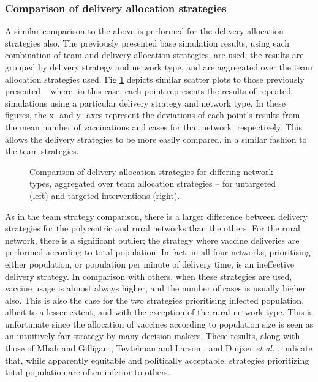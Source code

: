 \documentclass[10pt,letterpaper]{article}
\begin{document}
\subsubsection*{Comparison of delivery allocation strategies}
A similar comparison to the above is performed for the delivery allocation strategies also. The previously presented base simulation results, using each combination of team and delivery allocation strategies, are used; the results are grouped by delivery strategy and network type, and are aggregated over the team allocation strategies used. Fig \ref{fig:vacc_scatter} depicts similar scatter plots to those previously presented -- where, in this case, each point represents the results of repeated simulations using a particular delivery strategy and network type. In these figures, the x- and y- axes represent the deviations of each point's results from the mean number of vaccinations and cases for that network, respectively. This allows the delivery strategies to be more easily compared, in a similar fashion to the team strategies.

\begin{figure}[ht!]
  \caption{Comparison of delivery allocation strategies for differing network types, aggregated over team allocation strategies -- for untargeted (left) and targeted interventions (right).}
   \label{fig:vacc_scatter}
\end{figure}

As in the team strategy comparison, there is a larger difference between delivery strategies for the polycentric and rural networks than the others. For the rural network, there is a significant outlier; the strategy where vaccine deliveries are performed according to total population. In fact, in all four networks, prioritising either population, or population per minute of delivery time, is an ineffective delivery strategy. In comparison with others, when these strategies are used, vaccine usage is almost always higher, and the number of cases is usually higher also. This is also the case for the two strategies prioritising infected population, albeit to a lesser extent, and with the exception of the rural network type. This is unfortunate since the allocation of vaccines according to population size is seen as an intuitively fair strategy by many decision makers. These results, along with those of Mbah and Gilligan \cite{mbah2011resource}, Teytelman and Larson \cite{teytelman2013multiregional}, and Duijzer \textit{et al.} \cite{duijzer2018dose}, indicate that, while apparently equitable and politically acceptable, strategies prioritizing total population are often inferior to others.
\end{document}
